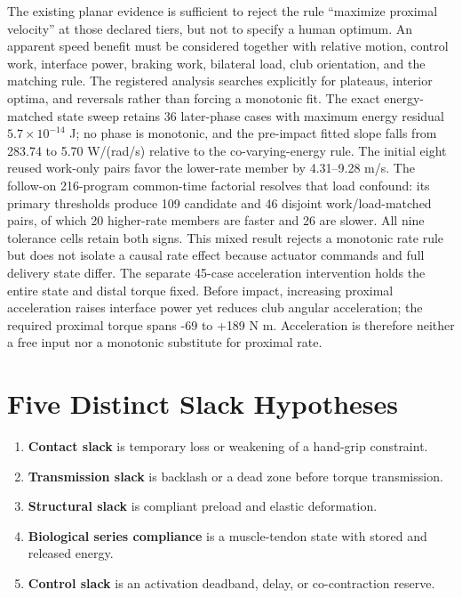 \documentclass[
  letterpaper,
]{report}
\providecommand{\tightlist}{%
  \setlength{\itemsep}{0pt}\setlength{\parskip}{0pt}}
\begin{document}
The existing planar evidence is sufficient to reject the rule ``maximize
proximal velocity'' at those declared tiers, but not to specify a human
optimum. An apparent speed benefit must be considered together with
relative motion, control work, interface power, braking work, bilateral
load, club orientation, and the matching rule. The registered analysis
searches explicitly for plateaus, interior optima, and reversals rather
than forcing a monotonic fit. The exact energy-matched state sweep
retains 36 later-phase cases with maximum energy residual
\(5.7\times10^{-14}\) J; no phase is monotonic, and the pre-impact
fitted slope falls from 283.74 to 5.70 W/(rad/s) relative to the
co-varying-energy rule. The initial eight reused work-only pairs favor
the lower-rate member by 4.31--9.28 m/s. The follow-on 216-program
common-time factorial resolves that load confound: its primary
thresholds produce 109 candidate and 46 disjoint work/load-matched
pairs, of which 20 higher-rate members are faster and 26 are slower. All
nine tolerance cells retain both signs. This mixed result rejects a
monotonic rate rule but does not isolate a causal rate effect because
actuator commands and full delivery state differ. The separate 45-case
acceleration intervention holds the entire state and distal torque
fixed. Before impact, increasing proximal acceleration raises interface
power yet reduces club angular acceleration; the required proximal
torque spans -69 to +189 N m. Acceleration is therefore neither a free
input nor a monotonic substitute for proximal rate.

\section{Five Distinct Slack
Hypotheses}\label{five-distinct-slack-hypotheses}

\begin{enumerate}
\def\labelenumi{\arabic{enumi}.}
\tightlist
\item
  \textbf{Contact slack} is temporary loss or weakening of a hand-grip
  constraint.
\item
  \textbf{Transmission slack} is backlash or a dead zone before torque
  transmission.
\item
  \textbf{Structural slack} is compliant preload and elastic
  deformation.
\item
  \textbf{Biological series compliance} is a muscle-tendon state with
  stored and released energy.
\item
  \textbf{Control slack} is an activation deadband, delay, or
  co-contraction reserve.
\end{enumerate}
\end{document}
